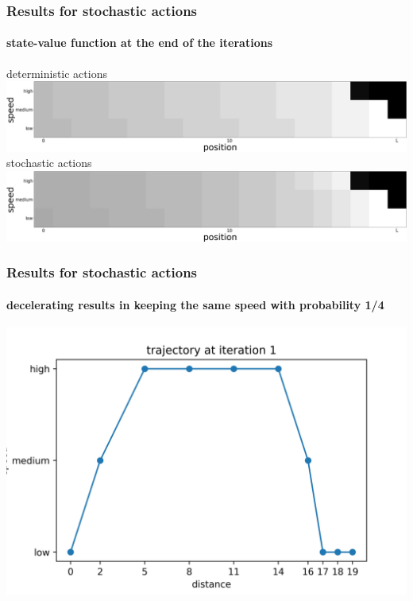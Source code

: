\documentclass[dvipsnames,svgnames]{beamer}
\begin{document}
\begin{frame}
\frametitle{Results for stochastic actions}
\framesubtitle{state-value function at the end of the iterations
}
\centering
deterministic actions\\
\vspace{0.1cm}
\includegraphics[scale=0.12]{img/value6.jpg}\\
\vspace{0.3cm}
stochastic actions\\
\vspace{0.1cm}
\includegraphics[scale=0.12]{img/state_values_sto.jpg}
\end{frame}

\begin{frame}
\frametitle{Results for stochastic actions}
\framesubtitle{decelerating  results in keeping the same speed with probability 1/4}
\centering
\includegraphics[scale=0.5]{img/trajectory1.jpg}
\end{frame}
\end{document}
